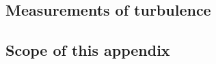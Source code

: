 \documentclass[12pt,twoside,english]{article}\usepackage[]{graphicx}\usepackage[]{color}
\let\stdsection\section
\renewcommand{\section}{\newpage\stdsection}
\begin{document}
{{\begin{appendices}
% 

% 
% 
% 
% 
% 
% 









\section{Measurements of turbulence\label{sec:turbulence}}

\subsection{Scope of this appendix}


\end{appendices}}}
\end{document}
